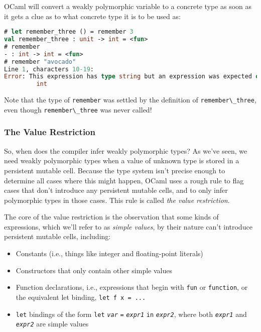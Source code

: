 OCaml will convert a weakly polymorphic variable to a concrete type as
soon as it gets a clue as to what concrete type it is to be used as:

\begin{lstlisting}[language=Caml]
# let remember_three () = remember 3
val remember_three : unit -> int = <fun>
# remember
- : int -> int = <fun>
# remember "avocado"
Line 1, characters 10-19:
Error: This expression has type string but an expression was expected of type
         int
\end{lstlisting}

Note that the type of \passthrough{\lstinline!remember!} was settled by
the definition of \passthrough{\lstinline!remember\_three!}, even though
\passthrough{\lstinline!remember\_three!} was never called!

\hypertarget{the-value-restriction}{%
\subsubsection{The Value Restriction}\label{the-value-restriction}}

So, when does the compiler infer weakly polymorphic types? As we've
seen, we need weakly polymorphic types when a value of unknown type is
stored in a persistent mutable cell. Because the type system isn't
precise enough to determine all cases where this might happen, OCaml
uses a rough rule to flag cases that don't introduce any persistent
mutable cells, and to only infer polymorphic types in those cases. This
rule is called \emph{the value restriction}. 

The core of the value restriction is the observation that some kinds of
expressions, which we'll refer to as \emph{simple values}, by their
nature can't introduce persistent mutable cells, including:

\begin{itemize}
\item
  Constants (i.e., things like integer and floating-point literals)
\item
  Constructors that only contain other simple values
\item
  Function declarations, i.e., expressions that begin with
  \passthrough{\lstinline!fun!} or \passthrough{\lstinline!function!},
  or the equivalent let binding, \passthrough{\lstinline!let f x = ...!}
\item
  \passthrough{\lstinline!let!} bindings of the form
  \passthrough{\lstinline!let!} \emph{\passthrough{\lstinline!var!}}
  \passthrough{\lstinline!=!} \emph{\passthrough{\lstinline!expr1!}}
  \passthrough{\lstinline!in!} \emph{\passthrough{\lstinline!expr2!}},
  where both \emph{\passthrough{\lstinline!expr1!}} and
  \emph{\passthrough{\lstinline!expr2!}} are simple values
\end{itemize}

